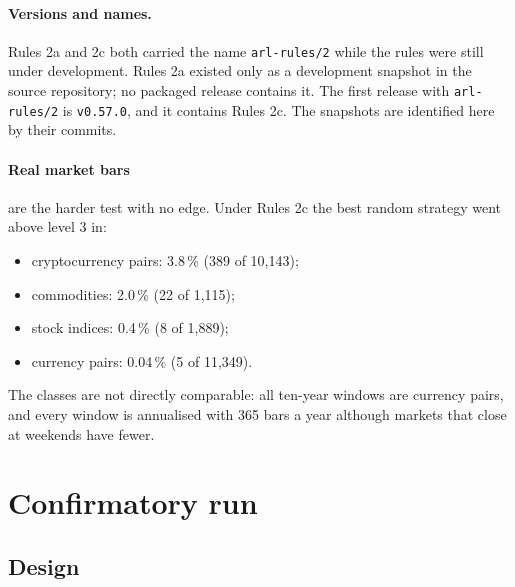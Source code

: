 \documentclass[11pt]{article}
\begin{document}
\paragraph{Versions and names.} Rules 2a and 2c both carried the name \texttt{arl-rules/2} while the rules were still
under development. Rules 2a existed only as a development snapshot in the source repository; no packaged release
contains it. The first release with \texttt{arl-rules/2} is \texttt{v0.57.0}, and it contains Rules 2c. The snapshots
are identified here by their commits.

\paragraph{Real market bars} are the harder test with no edge. Under Rules 2c the best random strategy went above level 3
in:
\begin{itemize}
\item cryptocurrency pairs: 3.8\,\% (389 of 10,143);
\item commodities: 2.0\,\% (22 of 1,115);
\item stock indices: 0.4\,\% (8 of 1,889);
\item currency pairs: 0.04\,\% (5 of 11,349).
\end{itemize}
The classes are not directly comparable: all ten-year windows are currency pairs, and every window is annualised with
365 bars a year although markets that close at weekends have fewer.

\section{Confirmatory run}\label{sec:confirm}

\subsection{Design}
\end{document}

